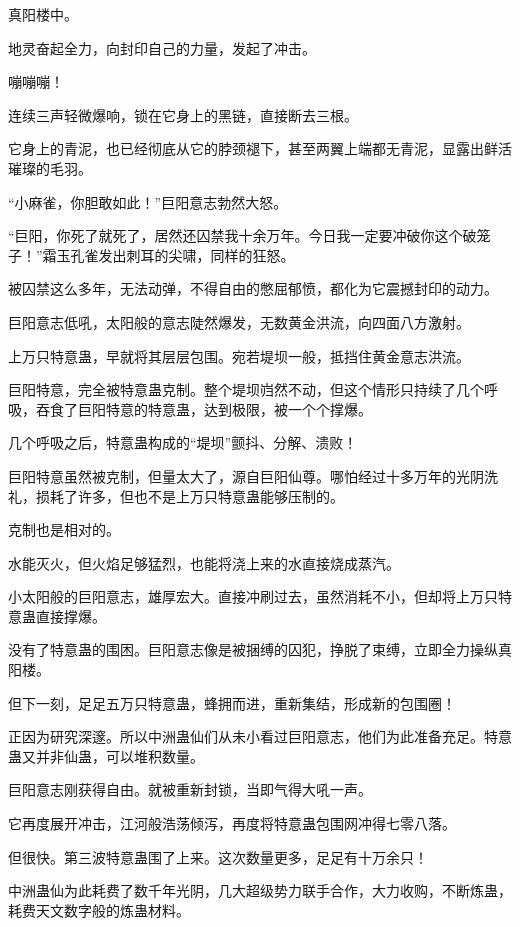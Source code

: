 
\begin{this_body}

真阳楼中。

地灵奋起全力，向封印自己的力量，发起了冲击。

嘣嘣嘣！

连续三声轻微爆响，锁在它身上的黑链，直接断去三根。

它身上的青泥，也已经彻底从它的脖颈褪下，甚至两翼上端都无青泥，显露出鲜活璀璨的毛羽。

“小麻雀，你胆敢如此！”巨阳意志勃然大怒。

“巨阳，你死了就死了，居然还囚禁我十余万年。今日我一定要冲破你这个破笼子！”霜玉孔雀发出刺耳的尖啸，同样的狂怒。

被囚禁这么多年，无法动弹，不得自由的憋屈郁愤，都化为它震撼封印的动力。

巨阳意志低吼，太阳般的意志陡然爆发，无数黄金洪流，向四面八方激射。

上万只特意蛊，早就将其层层包围。宛若堤坝一般，抵挡住黄金意志洪流。

巨阳特意，完全被特意蛊克制。整个堤坝岿然不动，但这个情形只持续了几个呼吸，吞食了巨阳特意的特意蛊，达到极限，被一个个撑爆。

几个呼吸之后，特意蛊构成的“堤坝”颤抖、分解、溃败！

巨阳特意虽然被克制，但量太大了，源自巨阳仙尊。哪怕经过十多万年的光阴洗礼，损耗了许多，但也不是上万只特意蛊能够压制的。

克制也是相对的。

水能灭火，但火焰足够猛烈，也能将浇上来的水直接烧成蒸汽。

小太阳般的巨阳意志，雄厚宏大。直接冲刷过去，虽然消耗不小，但却将上万只特意蛊直接撑爆。

没有了特意蛊的围困。巨阳意志像是被捆缚的囚犯，挣脱了束缚，立即全力操纵真阳楼。

但下一刻，足足五万只特意蛊，蜂拥而进，重新集结，形成新的包围圈！

正因为研究深邃。所以中洲蛊仙们从未小看过巨阳意志，他们为此准备充足。特意蛊又并非仙蛊，可以堆积数量。

巨阳意志刚获得自由。就被重新封锁，当即气得大吼一声。

它再度展开冲击，江河般浩荡倾泻，再度将特意蛊包围网冲得七零八落。

但很快。第三波特意蛊围了上来。这次数量更多，足足有十万余只！

中洲蛊仙为此耗费了数千年光阴，几大超级势力联手合作，大力收购，不断炼蛊，耗费天文数字般的炼蛊材料。


\end{this_body}
